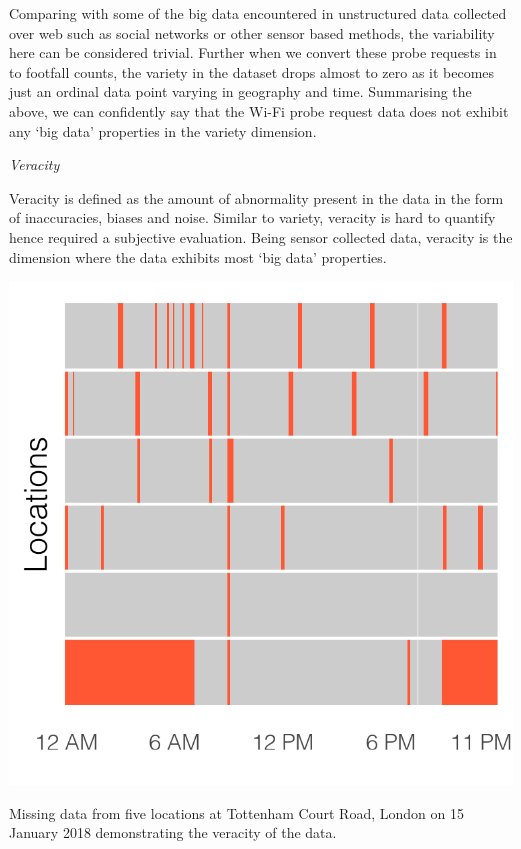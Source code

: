 Comparing with some of the big data encountered in unstructured data collected over web such as social networks or other sensor based methods, the variability here can be considered trivial.
Further when we convert these probe requests in to footfall counts, the variety in the dataset drops almost to zero as it becomes just an ordinal data point varying in geography and time.
Summarising the above, we can confidently say that the Wi-Fi probe request data does not exhibit any `big data' properties in the variety dimension.


\vspace{1.5em}\noindent\textit{Veracity}\vspace{0.5em}

Veracity is defined as the amount of abnormality present in the data in the form of inaccuracies, biases and noise.
Similar to variety, veracity is hard to quantify hence required a subjective evaluation.
Being sensor collected data, veracity is the dimension where the data exhibits most `big data' properties.


\begin{marginfigure}
  \includegraphics{images/data-veracity-gaps.png}
  \caption{Missing data from five locations at Tottenham Court Road, London on 15 January 2018 demonstrating the veracity of the data.}
  \label{figure:toolkit:veracity:gaps}
\end{marginfigure}

